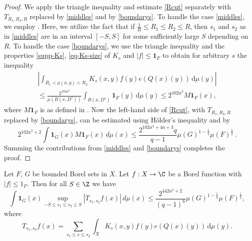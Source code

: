 \begin{proof}
We apply the triangle inequality and estimate \eqref{Rcut} separately with $T_{R_1,R_2,R}$ replaced by \eqref{middles} and by \eqref{boundarys}.
To handle the case \eqref{middles}, we employ . Here, we utilize the fact that if $\frac 1R\le R_1\le R_2\le R$, then $s_1$ and $s_2$ as in \eqref{middles} are in an interval $[-S,S]$ for some sufficiently large $S$ depending on $R$.
To handle the case \eqref{boundarys}, we use the triangle inequality and the properties \eqref{supp-Ks}, \eqref{eq-Ks-size} of $K_s$  and $|f| \le \mathbf{1}_F$ to obtain for arbitrary $s$ the inequality
\begin{multline}
\left|\int_{R_1 < \rho(x,y) < R_2} K_s(x,y) f(y) e(Q(x)(y)) \, \mathrm{d}\mu(y)\right|\\
\leq \frac{2^{102 a^3}}{\mu(B(x, D^{s}))}
 \int_{B(x, D^s)} \mathbf{1}_F(y) \, \mathrm{d}\mu(y)
\leq 2^{102 a^3} M\mathbf{1}_F(x),
\end{multline}
where $M\mathbf{1}_F$ is as defined in .
Now the left-hand side of \eqref{Rcut}, with $T_{R_1,R_2,R}$ replaced by \eqref{boundarys}, can be estimated using H\"older's inequality and  by
$$
    2^{102a^3+2}\int \mathbf{1}_{G}(x) M\mathbf{1}_F(x)\, d\mu(x)
    \le \frac{2^{102a^3+4a+3}q}{q-1}\mu(G)^{1-\frac{1}{q}} \mu(F)^{\frac{1}{q}}\,.
$$
Summing the contributions from \eqref{middles} and \eqref{boundarys} completes the proof.
\end{proof}

\begin{lemma}[S truncation]
    \label{S-truncation}
    \leanok
    Let $F$, $G$ be bounded Borel sets in $X$.
    Let $f:X\to \C$ be a Borel function with $|f|\le 1_F$. Then for all $S\in\Z$ we have
    \begin{equation} \label{Scut}
        \int \mathbf{1}_G(x) \sup_{-S\le s_1\le s_2\le S} |T_{s_1,s_2} f(x)|\, d\mu(x)
        \le \frac{2^{442a^3+2}}{(q-1)^6} \mu(G)^{1-\frac{1}{q}} \mu(F)^{\frac{1}{q}},
    \end{equation}
    where
    \begin{equation}\label{Tss}
        T_{s_1,s_2} f(x) = \sum_{s_1\le s \le s_2} \int_X K_s(x,y) f(y) e(Q(x)(y)) \, \mathrm{d}\mu(y).
    \end{equation}
\end{lemma}

